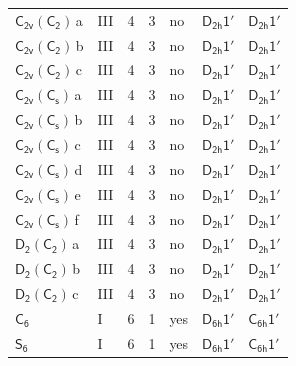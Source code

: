 \documentclass[10pt,a4paper]{article}
\numberwithin{equation}{section}
\newcommand{\grp}[1]{\mathsf{#1}}
\newcommand{\clsletter}[1]{\,{\scriptsize\color{black!55}#1}}
\begin{document}
{\begin{longtable}{@{}llrrlll@{}}
\href{C2v-C2.pdf}{$\grp{C_{2v}}(\grp{C_{2}})$}\clsletter{a} & III & 4 & 3 & no & \href{D2h-1p.pdf}{$\grp{D_{2h}1'}$} & \href{D2h-1p.pdf}{$\grp{D_{2h}1'}$}\\
\href{C2v-C2.pdf}{$\grp{C_{2v}}(\grp{C_{2}})$}\clsletter{b} & III & 4 & 3 & no & \href{D2h-1p.pdf}{$\grp{D_{2h}1'}$} & \href{D2h-1p.pdf}{$\grp{D_{2h}1'}$}\\
\href{C2v-C2.pdf}{$\grp{C_{2v}}(\grp{C_{2}})$}\clsletter{c} & III & 4 & 3 & no & \href{D2h-1p.pdf}{$\grp{D_{2h}1'}$} & \href{D2h-1p.pdf}{$\grp{D_{2h}1'}$}\\
\href{C2v-C1v.pdf}{$\grp{C_{2v}}(\grp{C_{s}})$}\clsletter{a} & III & 4 & 3 & no & \href{D2h-1p.pdf}{$\grp{D_{2h}1'}$} & \href{D2h-1p.pdf}{$\grp{D_{2h}1'}$}\\
\href{C2v-C1v.pdf}{$\grp{C_{2v}}(\grp{C_{s}})$}\clsletter{b} & III & 4 & 3 & no & \href{D2h-1p.pdf}{$\grp{D_{2h}1'}$} & \href{D2h-1p.pdf}{$\grp{D_{2h}1'}$}\\
\href{C2v-C1v.pdf}{$\grp{C_{2v}}(\grp{C_{s}})$}\clsletter{c} & III & 4 & 3 & no & \href{D2h-1p.pdf}{$\grp{D_{2h}1'}$} & \href{D2h-1p.pdf}{$\grp{D_{2h}1'}$}\\
\href{C2v-C1v.pdf}{$\grp{C_{2v}}(\grp{C_{s}})$}\clsletter{d} & III & 4 & 3 & no & \href{D2h-1p.pdf}{$\grp{D_{2h}1'}$} & \href{D2h-1p.pdf}{$\grp{D_{2h}1'}$}\\
\href{C2v-C1v.pdf}{$\grp{C_{2v}}(\grp{C_{s}})$}\clsletter{e} & III & 4 & 3 & no & \href{D2h-1p.pdf}{$\grp{D_{2h}1'}$} & \href{D2h-1p.pdf}{$\grp{D_{2h}1'}$}\\
\href{C2v-C1v.pdf}{$\grp{C_{2v}}(\grp{C_{s}})$}\clsletter{f} & III & 4 & 3 & no & \href{D2h-1p.pdf}{$\grp{D_{2h}1'}$} & \href{D2h-1p.pdf}{$\grp{D_{2h}1'}$}\\
\href{D2-C2.pdf}{$\grp{D_{2}}(\grp{C_{2}})$}\clsletter{a} & III & 4 & 3 & no & \href{D2h-1p.pdf}{$\grp{D_{2h}1'}$} & \href{D2h-1p.pdf}{$\grp{D_{2h}1'}$}\\
\href{D2-C2.pdf}{$\grp{D_{2}}(\grp{C_{2}})$}\clsletter{b} & III & 4 & 3 & no & \href{D2h-1p.pdf}{$\grp{D_{2h}1'}$} & \href{D2h-1p.pdf}{$\grp{D_{2h}1'}$}\\
\href{D2-C2.pdf}{$\grp{D_{2}}(\grp{C_{2}})$}\clsletter{c} & III & 4 & 3 & no & \href{D2h-1p.pdf}{$\grp{D_{2h}1'}$} & \href{D2h-1p.pdf}{$\grp{D_{2h}1'}$}\\
\href{../../../rotation/data/pdf/C6.pdf}{$\grp{C_{6}}$} & I & 6 & 1 & yes & \href{D6h-1p.pdf}{$\grp{D_{6h}1'}$} & \href{C6h-1p.pdf}{$\grp{C_{6h}1'}$}\\
\href{../../../rotation/data/pdf/S6.pdf}{$\grp{S_{6}}$} & I & 6 & 1 & yes & \href{D6h-1p.pdf}{$\grp{D_{6h}1'}$} & \href{C6h-1p.pdf}{$\grp{C_{6h}1'}$}\\

\end{longtable}}
\end{document}
